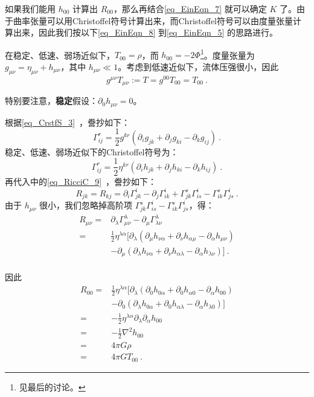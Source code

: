 如果我们能用 $h_{00}$ 计算出 $R_{00}$，那么再结合\autoref{eq_EinEqn_7} 就可以确定 $K$ 了。由于曲率张量可以用Christoffel符号计算出来，而Christoffel符号可以由度量张量计算出来，因此我们按以下\autoref{eq_EinEqn_8} 到\autoref{eq_EinEqn_5} 的思路进行。

在稳定、低速、弱场近似下，$T_{00}=\rho$，而 $h_{00}=-2\Phi$\footnote{见最后的讨论。}。度量张量为 $g_{\mu\nu}=\eta_{\mu\nu}+h_{\mu\nu}$，其中 $h_{\mu\nu}\ll 1$。考虑到低速近似下，流体压强很小，因此 
\begin{equation}\label{eq_EinEqn_10}
g^{\mu\nu}T_{\mu\nu}:=T=g^{00}T_{00}=T_{00}~.
\end{equation}

特别要注意，\textbf{稳定}假设：$\partial_0h_{\mu\nu}=0$。


根据\autoref{eq_CrstfS_3}~，誊抄如下：
\begin{equation}\label{eq_EinEqn_8}
\Gamma^{r}_{ij}=\frac{1}{2}g^{kr}(\partial_ig_{jk}+\partial_jg_{ki}-\partial_kg_{ij})~.
\end{equation}
稳定、低速、弱场近似下的Christoffel符号为：
\begin{equation}
\Gamma^{r}_{ij}=\frac{1}{2}\eta^{kr}(\partial_ih_{jk}+\partial_jh_{ki}-\partial_kh_{ij})~.
\end{equation}
再代入中的\autoref{eq_RicciC_9}~，誊抄如下：
\begin{equation}
R_{jk}=R_{kj}=\partial_i\Gamma^i_{jk}-\partial_j\Gamma^{i}_{ik}+\Gamma^s_{jk}\Gamma^i_{is}-\Gamma^s_{ik}\Gamma^i_{js}~.
\end{equation}
由于 $h_{\mu\nu}$ 很小，我们忽略掉高阶项 $\Gamma^s_{jk}\Gamma^i_{is}-\Gamma^s_{ik}\Gamma^i_{js}$，得：
\begin{equation}
\begin{aligned}
R_{\mu\nu}=&\partial_\lambda\Gamma^\lambda_{\mu\nu}-\partial_{\mu}\Gamma^\lambda_{\lambda\nu}\\
=&\frac{1}{2}\eta^{\lambda\alpha}[\partial_\lambda(\partial_\mu h_{\nu \alpha}+\partial_\nu h_{\alpha\mu}-\partial_\alpha h_{\mu\nu})\\
&-\partial_\mu(\partial_\lambda h_{\nu\alpha}+\partial_\nu h_{\alpha\lambda}-\partial_\alpha h_{\lambda\nu})]~.\\
\end{aligned}
\end{equation}

因此
\begin{equation}\label{eq_EinEqn_5}
\begin{aligned}
R_{00}=&\frac{1}{2}\eta^{\lambda\alpha}[\partial_\lambda(\partial_0 h_{0 \alpha}+\partial_0 h_{\alpha0}-\partial_\alpha h_{00})\\
&-\partial_0(\partial_\lambda h_{0\alpha}+\partial_0 h_{\alpha\lambda}-\partial_\alpha h_{\lambda0})]\\
=&-\frac{1}{2}\eta^{\lambda\alpha}\partial_\lambda\partial_\alpha h_{00}\\
=&-\frac{1}{2}\nabla^2 h_{00}\\
=&4\pi G\rho\\
=&4\pi GT_{00}~.
\end{aligned}
\end{equation}

